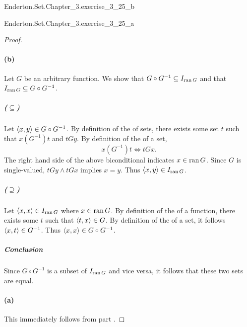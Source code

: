 \documentclass{report}
\begin{document}
    {Enderton.Set.Chapter\_3.exercise\_3\_25\_b}

    {Enderton.Set.Chapter\_3.exercise\_3\_25\_a}

  \begin{proof}

    \paragraph{(b)}%

      Let $G$ be an arbitrary function.
      We show that $G \circ G^{-1} \subseteq I_{\mathop{\text{ran}}{G}}$ and that
        $I_{\mathop{\text{ran}}{G}} \subseteq G \circ G^{-1}$.

      \subparagraph{($\subseteq$)}%

        Let $\left< x, y \right> \in G \circ G^{-1}$.
        By definition of the  of sets, there exists some
          set $t$ such that $x(G^{-1})t$ and $tGy$.
        By definition of the  of a set,
          $$x(G^{-1})t \iff tGx.$$
        The right hand side of the above biconditional indicates $x \in \mathop{\text{ran}}{G}$.
        Since $G$ is single-valued, $tGy \land tGx$ implies $x = y$.
        Thus $\left< x, y \right> \in I_{\mathop{\text{ran}}{G}}$.

      \subparagraph{($\supseteq$)}%

        Let $\left< x, x \right> \in I_{\mathop{\text{ran}}{G}}$ where $x \in \mathop{\text{ran}}{G}$.
        By definition of the  of a function, there exists some
          $t$ such that $\left< t, x \right> \in G$.
        By definition of the  of a set, it follows
          $\left< x, t \right> \in G^{-1}$.
        Thus $\left< x, x \right> \in G \circ G^{-1}$.

      \subparagraph{Conclusion}%

        Since $G \circ G^{-1}$ is a subset of $I_{\mathop{\text{ran}}{G}}$ and vice versa, it
          follows that these two sets are equal.

    \paragraph{(a)}%

      This immediately follows from part .

  \end{proof}

\subsection{}%
\end{document}
